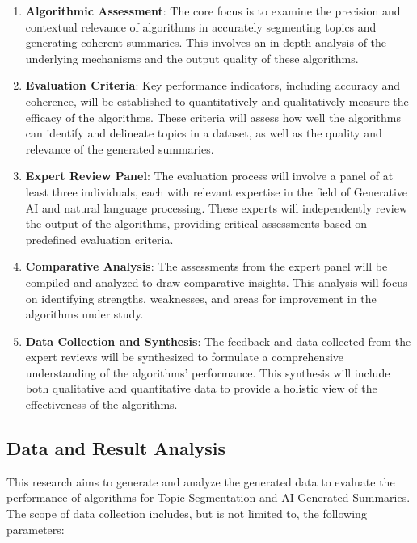 \begin{enumerate}
    \item \textbf{Algorithmic Assessment}: The core focus is to examine the precision and contextual relevance of algorithms in accurately segmenting topics and generating coherent summaries. This involves an in-depth analysis of the underlying mechanisms and the output quality of these algorithms.
    
    \item \textbf{Evaluation Criteria}: Key performance indicators, including accuracy and coherence, will be established to quantitatively and qualitatively measure the efficacy of the algorithms. These criteria will assess how well the algorithms can identify and delineate topics in a dataset, as well as the quality and relevance of the generated summaries.
    
    \item \textbf{Expert Review Panel}: The evaluation process will involve a panel of at least three individuals, each with relevant expertise in the field of Generative AI and natural language processing. These experts will independently review the output of the algorithms, providing critical assessments based on predefined evaluation criteria.
    
    \item \textbf{Comparative Analysis}: The assessments from the expert panel will be compiled and analyzed to draw comparative insights. This analysis will focus on identifying strengths, weaknesses, and areas for improvement in the algorithms under study.
    
    \item \textbf{Data Collection and Synthesis}: The feedback and data collected from the expert reviews will be synthesized to formulate a comprehensive understanding of the algorithms’ performance. This synthesis will include both qualitative and quantitative data to provide a holistic view of the effectiveness of the algorithms.
\end{enumerate}






\subsection{Data and Result Analysis}
This research aims to generate and analyze the generated data to evaluate the performance of algorithms for Topic Segmentation and AI-Generated Summaries. The scope of data collection includes, but is not limited to, the following parameters:


